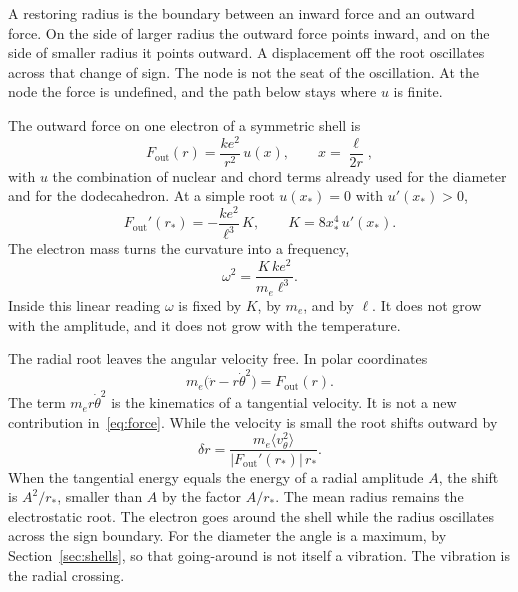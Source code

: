 \documentclass[a4paper]{article}
\begin{document}
A restoring radius is the boundary between an inward force and an outward force. On the side of larger radius the outward force points inward, and on the side of smaller radius it points outward. A displacement off the root oscillates across that change of sign. The node is not the seat of the oscillation. At the node the force is undefined, and the path below stays where \(u\) is finite.

The outward force on one electron of a symmetric shell is
\begin{equation}
\label{eq:Fout}
F_{\mathrm{out}}(r)=\frac{k e^{2}}{r^{2}}\,u(x),
\qquad
x=\frac{\ell}{2r},
\end{equation}
with \(u\) the combination of nuclear and chord terms already used for the diameter and for the dodecahedron. At a simple root \(u(x_*)=0\) with \(u'(x_*)>0\),
\begin{equation}
\label{eq:curv}
F_{\mathrm{out}}'(r_*)=-\frac{k e^{2}}{\ell^{3}}\,K,
\qquad
K=8x_*^4\,u'(x_*).
\end{equation}
The electron mass turns the curvature into a frequency,
\begin{equation}
\label{eq:omega}
\omega^{2}=\frac{K\,k e^{2}}{m_e\ell^{3}}.
\end{equation}
Inside this linear reading \(\omega\) is fixed by \(K\), by \(m_e\), and by \(\ell\). It does not grow with the amplitude, and it does not grow with the temperature.

The radial root leaves the angular velocity free. In polar coordinates
\begin{equation}
\label{eq:polar}
m_e\bigl(\ddot r-r\dot\theta^{2}\bigr)=F_{\mathrm{out}}(r).
\end{equation}
The term \(m_e r\dot\theta^{2}\) is the kinematics of a tangential velocity. It is not a new contribution in~\eqref{eq:force}. While the velocity is small the root shifts outward by
\begin{equation}
\label{eq:shift}
\delta r=\frac{m_e\langle v_{\theta}^{2}\rangle}{|F_{\mathrm{out}}'(r_*)|\,r_*}.
\end{equation}
When the tangential energy equals the energy of a radial amplitude \(A\), the shift is \(A^{2}/r_*\), smaller than \(A\) by the factor \(A/r_*\). The mean radius remains the electrostatic root. The electron goes around the shell while the radius oscillates across the sign boundary. For the diameter the angle is a maximum, by Section~\ref{sec:shells}, so that going-around is not itself a vibration. The vibration is the radial crossing.
\end{document}
